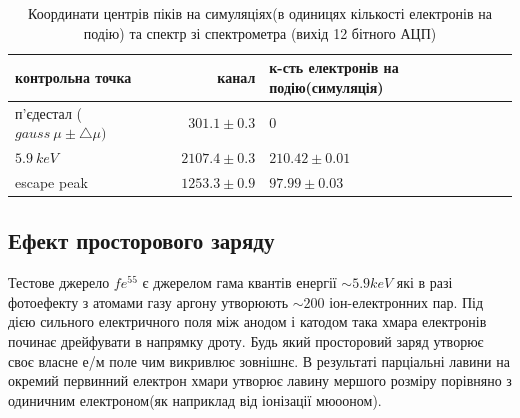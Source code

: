 \documentclass[pdftex,14pt]{scrartcl}
\begin{document}
	\begin{table}[!h]
	\centering
	\begin{tabular}{|l|r|l|}
		\hline
		контрольна точка & канал & к-сть електронів на подію(симуляція) \\
		\hline
		п'єдестал ($gauss~\mu \pm \bigtriangleup \mu)$ & $301.1 \pm 0.3 $ & 0\\
		\hline
		$5.9~keV$ & $2107.4 \pm 0.3$ & $210.42 \pm 0.01$ \\ 
		\hline
		escape peak & $1253.3 \pm 0.9 $ & $97.99 \pm 0.03$ \\
		\hline
	\end{tabular}
	\caption{ Координати центрів піків на симуляціях(в одиницях кількості електронів на подію) та спектр зі спектрометра (вихід 12 бітного АЦП)}
	\label{table:peakPos}
	\end{table}
	
	\subsection{Ефект просторового заряду}
	
	
	
	
	Тестове джерело $fe^{55}$ є джерелом гама квантів енергії $\sim 5.9 keV$ які в разі фотоефекту  з атомами газу аргону утворюють $\sim 200$	 іон-електронних пар. Під дією сильного електричного поля між анодом і катодом така хмара електронів починає дрейфувати в напрямку дроту. Будь який просторовий заряд утворює своє власне е/м поле чим викривлює зовнішнє. В результаті парціальні лавини на окремий первинний електрон хмари утворює лавину мершого розміру порівняно з одиничним електроном(як наприклад від іонізації мюооном).
	
\end{document}
